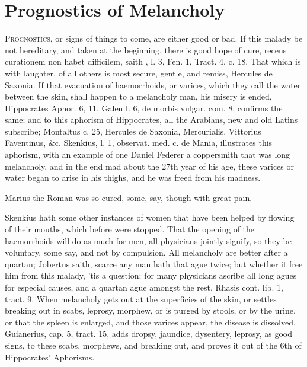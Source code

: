 \chapter{Prognostics of Melancholy}\label{ch:prognostics}

\lettrine{P}{rognostics}, or signs of things to come, are either good or bad. If
this malady be not hereditary, and taken at the beginning, there is
good hope of cure, recens curationem non habet difficilem, saith
\Avicenna{}, l. 3, Fen. 1, Tract. 4, c. 18. That which is with laughter,
of all others is most secure, gentle, and remiss, Hercules de Saxonia.
If that evacuation of haemorrhoids, or varices, which they call
the water between the skin, shall happen to a melancholy man, his
misery is ended, Hippocrates Aphor. 6, 11. Galen l. 6, de morbis
vulgar. com. 8, confirms the same; and to this aphorism of Hippocrates,
all the Arabians, new and old Latins subscribe; Montaltus c. 25,
Hercules de Saxonia, Mercurialis, Vittorius Faventinus, \&c. Skenkius,
l. 1, observat. med. c. de Mania, illustrates this aphorism, with an
example of one Daniel Federer a coppersmith that was long melancholy,
and in the end mad about the 27th year of his age, these varices or
water began to arise in his thighs, and he was freed from his madness.

Marius the Roman was so cured, some, say, though with great pain.

Skenkius hath some other instances of women that have been helped by
flowing of their mouths, which before were stopped. That the opening of
the haemorrhoids will do as much for men, all physicians jointly
signify, so they be voluntary, some say, and not by compulsion. All
melancholy are better after a quartan; Jobertus saith, scarce any
man hath that ague twice; but whether it free him from this malady,
'tis a question; for many physicians ascribe all long agues for
especial causes, and a quartan ague amongst the rest. Rhasis
cont. lib. 1, tract. 9. When melancholy gets out at the superficies of
the skin, or settles breaking out in scabs, leprosy, morphew, or is
purged by stools, or by the urine, or that the spleen is enlarged, and
those varices appear, the disease is dissolved. Guianerius, cap. 5,
tract. 15, adds dropsy, jaundice, dysentery, leprosy, as good signs, to
these scabs, morphews, and breaking out, and proves it out of the 6th
of Hippocrates' Aphorisms.

